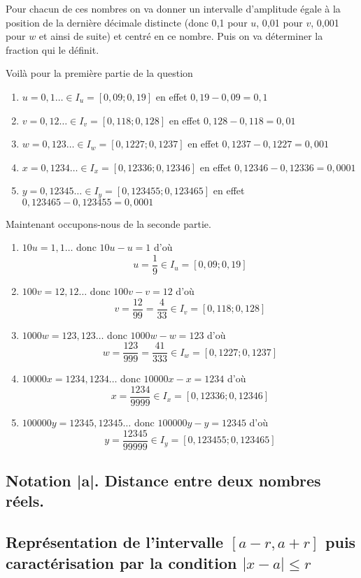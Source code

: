 \documentclass[11pt]{article}
\begin{document}
Pour chacun de ces nombres on va donner un intervalle d'amplitude
égale à la position de la dernière décimale distincte (donc 0,1
pour \(u\), 0,01 pour \(v\), 0,001 pour \(w\) et ainsi de suite) et
centré en ce nombre. Puis on va déterminer la fraction qui le
définit.

Voilà pour la première partie de la question

\begin{enumerate}
\item \(u = 0,1\dots\in I_u = [0,09 ; 0,19]\) en effet \(0,19 - 0,09 = 0,1\)
\item \(v = 0,12\dots\in I_v = [0,118 ; 0,128]\) en effet \(0,128 - 0,118 =
      0,01\)
\item \(w = 0,123\dots\in I_w = [0,1227 ; 0,1237]\) en effet \(0,1237 - 0,1227
      = 0,001\)
\item \(x = 0,1234\dots\in I_x = [0,12336 ; 0,12346]\) en effet \(0,12346 - 0,12336
      = 0,0001\)
\item \(y = 0,12345\dots\in I_y = [0,123455 ; 0,123465]\) en effet \(0,123465 - 0,123455
      = 0,0001\)
\end{enumerate}

Maintenant occupons-nous de la seconde partie.

\begin{enumerate}
\item \(10u = 1,1\dots\) donc \(10u - u = 1\) d'où \[u = \dfrac{1}{9}\in
      I_u = [0,09 ; 0,19]\]
\item \(100v = 12,12\dots\) donc \(100v - v = 12\) d'où \[v = \dfrac{12}{99}
      = \dfrac{4}{33}\in I_v = [0,118 ; 0,128]\]
\item \(1000w = 123,123\dots\) donc \(1000w - w = 123\) d'où \[w =
      \dfrac{123}{999} = \dfrac{41}{333}\in I_w = [0,1227 ; 0,1237]\]
\item \(10000x = 1234,1234\dots\) donc \(10000x - x = 1234\) d'où \[x =
      \dfrac{1234}{9999}\in I_x = [0,12336 ; 0,12346]\]
\item \(100000y = 12345,12345\dots\) donc \(100000y - y = 12345\) d'où \[y
      = \dfrac{12345}{99999}\in I_y = [0,123455 ; 0,123465]\]
\end{enumerate}


\subsection{Notation |a|. Distance entre deux nombres réels.}
\label{sec:org694ddab}
\subsection{Représentation de l'intervalle \([a - r, a + r]\) puis caractérisation par la condition \(|x - a| \leq r\)}
\label{sec:org1e0f28b}
\end{document}
